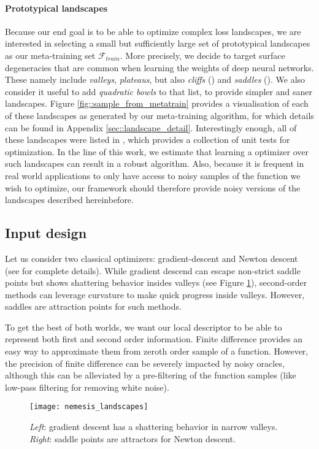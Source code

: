 	\paragraph{Prototypical landscapes} Because our end goal is to be able to optimize complex loss landscapes, we are interested in selecting a small but sufficiently large set of prototypical landscapes as our meta-training set $\mathcal{F}_{train}$. More precisely, we decide to target surface degeneracies that are common when learning the weights of deep neural networks. These namely include \emph{valleys}, \emph{plateaus}, but also \emph{cliffs} (\cite{bengio1994learning}) and \emph{saddles} (\cite{dauphin2014identifying}). We also consider it useful to add \emph{quadratic bowls} to that list, to provide simpler and saner landscapes. Figure \ref{fig::sample_from_metatrain} provides a visualisation of each of these landscapes as generated by our meta-training algorithm, for which details can be found in Appendix \ref{sec::landscape_detail}. Interestingly enough, all of these landscapes were listed in \cite{schaul2013unit}, which provides a collection of unit tests for optimization. In the line of this work, we estimate that learning a optimizer over such landscapes can result in a robust algorithm. Also, because it is frequent in real world applications to only have access to noisy samples of the function we wish to optimize, our framework should therefore provide noisy versions of the landscapes described hereinbefore. 
     		
\subsection{Input design}
Let us consider two classical optimizers: gradient-descent and Newton descent (see \cite{nocedal2006numerical} for complete details). While gradient descend can escape non-strict saddle points but shows shattering behavior insides valleys (see Figure \ref{fig::nemesis}), second-order methods can leverage curvature to make quick progress inside valleys. However, saddles are attraction points for such methods. 
	
	To get the best of both worlds, we want our local descriptor to be able to represent both first and second order information. Finite difference provides an easy way to approximate them from zeroth order sample of a function. However, the precision of finite difference can  be severely impacted by noisy oracles, although this can be alleviated by a pre-filtering of the function samples (like low-pass filtering for removing white noise). 
		\begin{figure}[h!]
			\begin{center}
				\texttt{[image: nemesis\_landscapes]}
				\caption[Nemesis landscapes]{\emph{Left}: gradient descent has a shattering behavior in narrow valleys. \emph{Right}: saddle points are attractors for Newton descent.}
				\label{fig::nemesis}
			\end{center}
		\end{figure}
			
